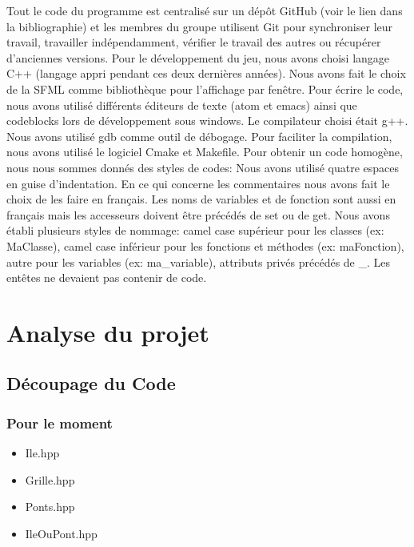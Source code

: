 \documentclass{article}
\begin{document}
    \hspace{0.5cm} Tout le code du programme est centralisé sur un dépôt GitHub (voir le lien dans la bibliographie) et les membres du groupe utilisent Git pour synchroniser leur travail, travailler indépendamment, vérifier le travail des autres ou récupérer d’anciennes versions.
    Pour le développement du jeu, nous avons choisi langage C++ (langage appri pendant ces deux dernières années).
    Nous avons fait le choix de la SFML comme bibliothèque pour l'affichage par fenêtre. 
    Pour écrire le code, nous avons utilisé différents éditeurs de texte (atom et emacs) ainsi que codeblocks lors de développement sous windows. Le compilateur choisi était g++. Nous avons utilisé gdb comme outil de débogage. Pour faciliter la compilation, nous avons utilisé le logiciel Cmake et Makefile. \newline
    Pour obtenir un code homogène, nous nous sommes donnés des styles de codes: Nous avons utilisé quatre espaces en guise d'indentation. En ce qui concerne les commentaires nous avons fait le choix de les faire en français. Les noms de variables et de fonction sont aussi en français mais les accesseurs doivent être précédés de set ou de get. Nous avons établi plusieurs styles de nommage: camel case supérieur pour les classes (ex: MaClasse), camel case inférieur pour les fonctions et méthodes (ex: maFonction), autre pour les variables (ex: ma\_variable), attributs privés précédés de \_. Les entêtes ne devaient pas contenir de code.
    
\section{\LARGE Analyse du projet}

    \subsection{\Large Découpage du Code}
        \subsubsection{Pour le moment}
        \begin{itemize}
        \item Ile.hpp
        \item Grille.hpp
        \item Ponts.hpp
        \item IleOuPont.hpp
        \end{itemize}
    
\end{document}
